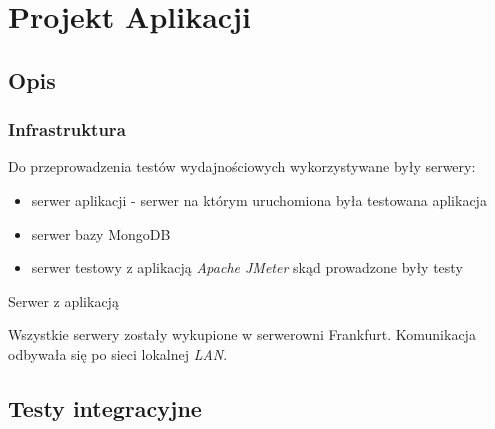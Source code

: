 \chapter{Projekt Aplikacji}
\section{Opis}
\subsection{Infrastruktura}
Do przeprowadzenia testów wydajnościowych wykorzystywane były serwery:
\begin{itemize}
    \item serwer aplikacji - serwer na którym uruchomiona była testowana aplikacja
    \item serwer bazy MongoDB
    \item serwer testowy z aplikacją \textsl{Apache JMeter} skąd prowadzone były testy
\end{itemize}
Serwer z aplikacją 

Wszystkie serwery zostały wykupione w serwerowni Frankfurt. Komunikacja odbywała się po sieci lokalnej \textsl{LAN}.

\section{Testy integracyjne}
